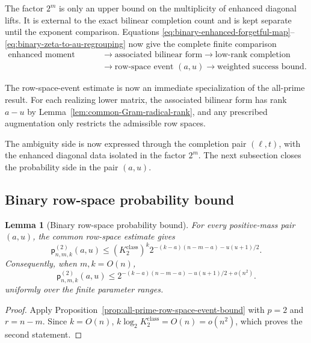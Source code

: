 \documentclass[11pt]{article}
\newcommand{\1}{\mathbf 1}
\theoremstyle{plain}
\newtheorem{lemma}[theorem]{Lemma}
\theoremstyle{definition}
\theoremstyle{remark}
\begin{document}
The factor $2^m$ is only an upper bound on the multiplicity of enhanced
diagonal lifts.  It is external to the exact bilinear completion count and is
kept separate until the exponent comparison.  Equations
\eqref{eq:binary-enhanced-forgetful-map}--
\eqref{eq:binary-zeta-to-au-regrouping} now give the complete finite comparison
\[
 \begin{aligned}
 \text{enhanced moment coset}
 &\longrightarrow \text{associated bilinear form}
 \longrightarrow \text{low-rank completion}\\
 &\longrightarrow \text{row-space event }(a,u)
 \longrightarrow \text{weighted success bound}.
 \end{aligned}
\]


The row-space-event estimate is now an immediate specialization of the
all-prime result.  For each realizing lower matrix, the associated bilinear
form has rank $a-u$ by Lemma~\ref{lem:common-Gram-radical-rank}, and any
prescribed augmentation only restricts the admissible row spaces.

The ambiguity side is now expressed through the completion pair
$(\ell,t)$, with the enhanced diagonal data isolated in the factor $2^m$.
The next subsection closes the probability side in the pair $(a,u)$.

\subsection{Binary row-space probability bound}
\begin{lemma}[Binary row-space probability bound]
\label{lem:integrated-binary-lower-block-probability}
For every positive-mass pair $(a,u)$, the common row-space estimate gives
\begin{equation}
 \mathsf p_{n,m,k}^{(2)}(a,u)
 \le (K_2^{\mathrm{class}})^k
 2^{-(k-a)(n-m-a)-u(u+1)/2}.
 \label{eq:binary-lower-block-probability-finite}
\end{equation}
Consequently, when $m,k=O(n)$,
\begin{equation}
 \mathsf p_{n,m,k}^{(2)}(a,u)
 \le2^{-(k-a)(n-m-a)-u(u+1)/2+o(n^2)}.
 \label{eq:integrated-binary-lower-block-probability}
\end{equation}
uniformly over the finite parameter ranges.
\end{lemma}
\begin{proof}
Apply Proposition~\ref{prop:all-prime-row-space-event-bound} with $p=2$ and
$r=n-m$.  Since $k=O(n)$,
$k\log_2K_2^{\mathrm{class}}=O(n)=o(n^2)$, which proves the second statement.
\end{proof}
\end{document}
